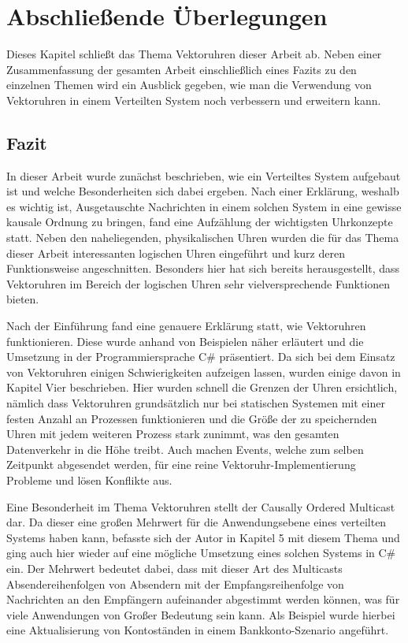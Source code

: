\section{Abschließende Überlegungen}
Dieses Kapitel schließt das Thema Vektoruhren dieser Arbeit ab. Neben einer Zusammenfassung der gesamten Arbeit einschließlich eines Fazits zu den einzelnen Themen wird ein Ausblick gegeben, wie man die Verwendung von Vektoruhren in einem Verteilten System noch verbessern und erweitern kann.
\subsection{Fazit}
In dieser Arbeit wurde zunächst beschrieben, wie ein Verteiltes System aufgebaut ist und welche Besonderheiten sich dabei ergeben. Nach einer Erklärung, weshalb es wichtig ist, Ausgetauschte Nachrichten in einem solchen System in eine gewisse kausale Ordnung zu bringen, fand eine Aufzählung der wichtigsten Uhrkonzepte statt. Neben den naheliegenden, physikalischen Uhren wurden die für das Thema dieser Arbeit interessanten logischen Uhren eingeführt und kurz deren Funktionsweise angeschnitten. Besonders hier hat sich bereits herausgestellt, dass Vektoruhren im Bereich der logischen Uhren sehr vielversprechende Funktionen bieten.

Nach der Einführung fand eine genauere Erklärung statt, wie Vektoruhren funktionieren. Diese wurde anhand von Beispielen näher erläutert und die Umsetzung in der Programmiersprache C\# präsentiert. Da sich bei dem Einsatz von Vektoruhren einigen Schwierigkeiten aufzeigen lassen, wurden einige davon in Kapitel Vier beschrieben. Hier wurden schnell die Grenzen der Uhren ersichtlich, nämlich dass Vektoruhren grundsätzlich nur bei statischen Systemen mit einer festen Anzahl an Prozessen funktionieren und die Größe der zu speichernden Uhren mit jedem weiteren Prozess stark zunimmt, was den gesamten Datenverkehr in die Höhe treibt. Auch machen Events, welche zum selben Zeitpunkt abgesendet werden, für eine reine Vektoruhr-Implementierung Probleme und lösen Konflikte aus.

Eine Besonderheit im Thema Vektoruhren stellt der Causally Ordered Multicast dar. Da dieser eine großen Mehrwert für die Anwendungsebene eines verteilten Systems haben kann, befasste sich der Autor in Kapitel 5 mit diesem Thema und ging auch hier wieder auf eine mögliche Umsetzung eines solchen Systems in C\# ein. Der Mehrwert bedeutet dabei, dass mit dieser Art des Multicasts Absendereihenfolgen von Absendern mit der Empfangsreihenfolge von Nachrichten an den Empfängern aufeinander abgestimmt werden können, was für viele Anwendungen von Großer Bedeutung sein kann. Als Beispiel wurde hierbei eine Aktualisierung von Kontoständen in einem Bankkonto-Szenario angeführt.

